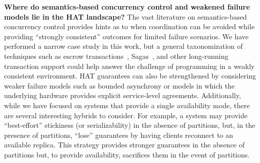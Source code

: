 \textbf{Where do semantics-based concurrency control and weakened
  failure models lie in the HAT landscape?} The vast
literature on semantics-based concurrency control provides hints as to
when coordination can be avoided while providing ``strongly
consistent'' outcomes for limited failure scenarios. We have performed
a narrow case study in this work, but a general taxonomization of
techniques such as escrow transactions~\cite{escrow},
Sagas~\cite{sagas}, and other long-running transaction support could
help answer the challenge of programming in a weakly consistent
environment. HAT guarantees can also be strengthened by considering
weaker failure models such as bounded asynchrony or models in which
the underlying hardware provides explicit service-level
agreements. Additionally, while we have focused on systems that
provide a single availability mode, there are several interesting
hybrids to consider. For example, a system may provide ``best-effort''
stickiness (or serializability) in the absence of partitions, but, in
the presence of partitions, ``lose'' guarantees by having clients
reconnect to an available replica. This strategy provides stronger
guarantees in the absence of partitions but, to provide availability,
sacrifices them in the event of partitions.
